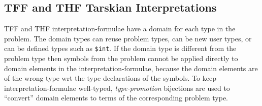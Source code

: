 \documentclass{easychair}
\begin{document}
\subsection{TFF and THF Tarskian Interpretations}
\label{NewTarskianTFFTHF}

TFF and THF interpretation-formulae have a domain for each type in the problem.
The domain types can reuse problem types, can be new user types, or can be defined types
such as {\tt \$int}.
If the domain type is different from the problem type then symbols from the problem cannot be 
applied directly to domain elements in the interpretation-formulae, because the domain elements 
are of the wrong type wrt the type declarations of the symbols.
To keep interpretation-formulae well-typed, \emph{type-promotion} bijections are used to ``convert'' 
domain elements to terms of the corresponding problem type.
\end{document}
